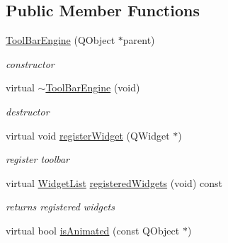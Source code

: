 \subsection*{Public Member Functions}
\begin{DoxyCompactItemize}
\item 
\mbox{\label{class_tool_bar_engine_a4c074c346b9e4a1bb855e8bd0411be92}} 
\hyperlink{class_tool_bar_engine_a4c074c346b9e4a1bb855e8bd0411be92}{Tool\+Bar\+Engine} (Q\+Object $\ast$parent)
\begin{DoxyCompactList}\small\item\em constructor \end{DoxyCompactList}\item 
\mbox{\label{class_tool_bar_engine_ab94b4deb94c0d6733e7328c42ec9b409}} 
virtual \hyperlink{class_tool_bar_engine_ab94b4deb94c0d6733e7328c42ec9b409}{$\sim$\+Tool\+Bar\+Engine} (void)
\begin{DoxyCompactList}\small\item\em destructor \end{DoxyCompactList}\item 
\mbox{\label{class_tool_bar_engine_acae0abc03760f9aeef4cfb0e4f294f46}} 
virtual void \hyperlink{class_tool_bar_engine_acae0abc03760f9aeef4cfb0e4f294f46}{register\+Widget} (Q\+Widget $\ast$)
\begin{DoxyCompactList}\small\item\em register toolbar \end{DoxyCompactList}\item 
\mbox{\label{class_tool_bar_engine_addd73bfc9641e45aa2c9045f63922774}} 
virtual \hyperlink{class_base_engine_a2b0faec98a7eb68c91b502459c46a9c7}{Widget\+List} \hyperlink{class_tool_bar_engine_addd73bfc9641e45aa2c9045f63922774}{registered\+Widgets} (void) const
\begin{DoxyCompactList}\small\item\em returns registered widgets \end{DoxyCompactList}\item 
\mbox{\label{class_tool_bar_engine_a48b06798103608878668bf752a3c5231}} 
virtual bool \hyperlink{class_tool_bar_engine_a48b06798103608878668bf752a3c5231}{is\+Animated} (const Q\+Object $\ast$)

\end{DoxyCompactItemize}
